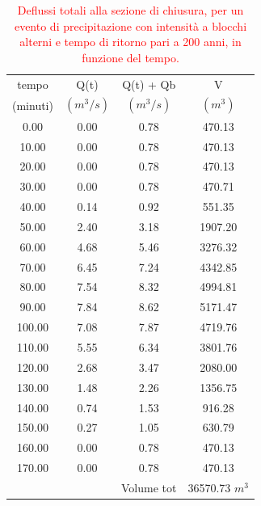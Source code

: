 \begin{table}[H] \centering
    \caption{\textcolor{red}{Deflussi totali alla sezione di chiusura, per un evento di precipitazione con intensità a blocchi alterni e tempo di ritorno pari a 200 anni, in funzione del tempo.}}
        \begin{tabular}{cccc}
        \toprule
        tempo        & Q(t)       & Q(t) + Qb  & V        \\
        (minuti)     & $(m^3/s)$  & $(m^3/s)$   & $(m^3)$     \\
        \midrule
        0.00         & 0.00       & 0.78       & 470.13   \\
        10.00        & 0.00       & 0.78       & 470.13   \\
        20.00        & 0.00       & 0.78       & 470.13   \\
        30.00        & 0.00       & 0.78       & 470.71   \\
        40.00        & 0.14       & 0.92       & 551.35   \\
        50.00        & 2.40       & 3.18       & 1907.20  \\
        60.00        & 4.68       & 5.46       & 3276.32  \\
        70.00        & 6.45       & 7.24       & 4342.85  \\
        80.00        & 7.54       & 8.32       & 4994.81  \\
        90.00        & 7.84       & 8.62       & 5171.47  \\
        100.00       & 7.08       & 7.87       & 4719.76  \\
        110.00       & 5.55       & 6.34       & 3801.76  \\
        120.00       & 2.68       & 3.47       & 2080.00  \\
        130.00       & 1.48       & 2.26       & 1356.75  \\
        140.00       & 0.74       & 1.53       & 916.28   \\
        150.00       & 0.27       & 1.05       & 630.79   \\
        160.00       & 0.00       & 0.78       & 470.13   \\
        170.00       & 0.00       & 0.78       & 470.13   \\
                     &            & Volume tot & 36570.73 $m^3$ \\
        \bottomrule
        \end{tabular}
        \end{table}


